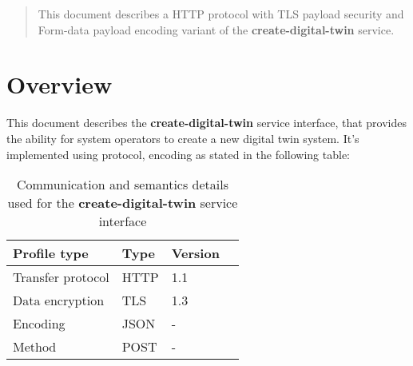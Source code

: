 \documentclass[a4paper]{arrowhead}
\begin{document}
\ArrowheadDate{\today}
\ArrowheadSetup

\begin{center}
  \vspace*{1cm}
  \huge{\arrowtitle}

  \vspace*{0.2cm}
  \LARGE{\arrowtype}
  \vspace*{1cm}
\end{center}

  \vspace*{\fill}


  \vspace*{1cm}
  \vspace*{\fill}

  \begin{abstract}
    This document describes a HTTP protocol with TLS payload
    security and Form-data payload encoding variant of the \textbf{create-digital-twin} service.
  \end{abstract}
  \vspace*{1cm}

\newpage

\tableofcontents
\newpage

\section{Overview}
\label{sec:overview}

This document describes the \textbf{create-digital-twin} service interface, that provides the ability for system operators to create a new digital twin system. 
It’s implemented using protocol, encoding as stated in the following table:

\begin{table}[H]
  \centering
  \begin{tabular}{|l|l|l|l|}
    \rowcolor{gray!33} Profile type & Type & Version \\ \hline
    Transfer protocol & HTTP & 1.1 \\ \hline
    Data encryption & TLS & 1.3 \\ \hline
    Encoding & JSON & - \\ \hline
    Method & POST & - \\ \hline
  \end{tabular}
  \caption{Communication and semantics details used for the \textbf{create-digital-twin}
    service interface}
  \label{tab:comunication_semantics_profile}
\end{table}
\end{document}
